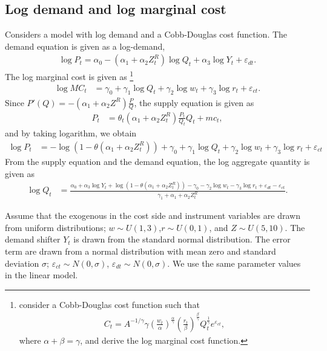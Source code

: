 \documentclass[11pt, a4paper]{article}
\begin{document}
\subsection{Log demand and log marginal cost}

Considers a model with log demand and a Cobb-Douglas cost function. 
The demand equation is given as a log-demand, 
\begin{align}
    \log P_{t} = \alpha_0 - (\alpha_1 + \alpha_2 Z^R_t) \log Q_t + \alpha_3 \log Y_t + \varepsilon_{dt}.
\end{align}
The log marginal cost is given as 
\footnote{\cite{hyde1995can} consider a Cobb-Douglas cost function such that \begin{align*}
    C_t = A^{-1/\gamma} \gamma \left(\frac{w_t}{\alpha}\right)^{\frac{\alpha}{\gamma}} \left(\frac{r_t}{\beta}\right)^{\frac{\beta}{\gamma}} Q_t^{\frac{1}{\gamma}}e^{\varepsilon_{ct}},
\end{align*} where $\alpha + \beta = \gamma$, and derive the log marginal cost function.}
\begin{align}
    \log MC_t &= \gamma_0 + \gamma_1 \log Q_t +  \gamma_2 \log w_t + \gamma_3 \log r_t + \varepsilon_{ct}.
\end{align}
Since $P'(Q) = - (\alpha_1 + \alpha_2 Z^R) \frac{P}{Q} $, the supply equation is given as
\begin{align}
    P_t &= \theta_t (\alpha_1 + \alpha_2 Z^R_t) \frac{P_t}{Q_t} Q_t + mc_t,
\end{align}
and by taking logarithm, we obtain
\begin{align}
    \log P_t & = - \log(1 - \theta(\alpha_1 + \alpha_2 Z^R_t)) + \gamma_0 + \gamma_1 \log Q_t +  \gamma_2 \log w_t + \gamma_3 \log r_t + \varepsilon_{ct}
\end{align}
From the supply equation and the demand equation, the log aggregate quantity is given as 
\begin{align}
    \log Q_t &= \frac{ \alpha_0 + \alpha_3 \log Y_t + \log (1 - \theta (\alpha_1 + \alpha_2 Z^R_t)) - \gamma_0  -  \gamma_2 \log w_t - \gamma_3 \log r_t + \varepsilon_{dt} - \varepsilon_{ct}}{\gamma_1+ \alpha_1 + \alpha_2 Z^R_t }.
\end{align}

Assume that the exogenous in the cost side and instrument variables are drawn from uniform distributions; $w \sim U(1,3)$,$r \sim U(0,1)$, and $Z \sim U(5, 10)$. The demand shifter $Y_t$ is drawn from the standard normal distribution.
The error term are drawn from a normal distribution with mean zero and standard deviation $\sigma$; $\varepsilon_{ct}\sim N(0,\sigma)$, $\varepsilon_{dt} \sim N(0,\sigma)$.
We use the same parameter values in the linear model.
\end{document}
